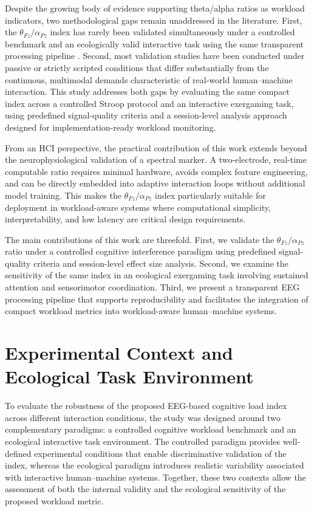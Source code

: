 \documentclass[10pt]{iopart}
\begin{document}
Despite the growing body of evidence supporting theta/alpha ratios
as workload indicators, two methodological gaps remain unaddressed
in the literature. First, the $\theta_{Fz}/\alpha_{Pz}$ index has
rarely been validated simultaneously under a controlled benchmark
and an ecologically valid interactive task using the same
transparent processing pipeline \cite{BigdelyShamlo2015_PREP}.
Second, most validation studies have been conducted under passive
or strictly scripted conditions that differ substantially from the
continuous, multimodal demands characteristic of real-world
human--machine interaction. This study addresses both gaps by
evaluating the same compact index across a controlled Stroop
protocol and an interactive exergaming task, using predefined
signal-quality criteria and a session-level analysis approach
designed for implementation-ready workload monitoring.

From an HCI perspective, the practical contribution of this work
extends beyond the neurophysiological validation of a spectral
marker. A two-electrode, real-time computable ratio requires
minimal hardware, avoids complex feature engineering, and can be
directly embedded into adaptive interaction loops without
additional model training. This makes the $\theta_{Fz}/\alpha_{Pz}$
index particularly suitable for deployment in workload-aware
systems where computational simplicity, interpretability, and
low latency are critical design requirements.

The main contributions of this work are threefold. First, we
validate the $\theta_{Fz}/\alpha_{Pz}$ ratio under a controlled
cognitive interference paradigm using predefined signal-quality
criteria and session-level effect size analysis. Second, we examine
the sensitivity of the same index in an ecological exergaming task
involving sustained attention and sensorimotor coordination. Third,
we present a transparent EEG processing pipeline that supports
reproducibility and facilitates the integration of compact workload
metrics into workload-aware human--machine systems.


\section{Experimental Context and Ecological Task Environment}

To evaluate the robustness of the proposed EEG-based cognitive load index across different interaction conditions, the study was designed around two complementary paradigms: a controlled cognitive workload benchmark and an ecological interactive task environment. The controlled paradigm provides well-defined experimental conditions that enable discriminative validation of the index, whereas the ecological paradigm introduces realistic variability associated with interactive human--machine systems. Together, these two contexts allow the assessment of both the internal validity and the ecological sensitivity of the proposed workload metric.
\end{document}
